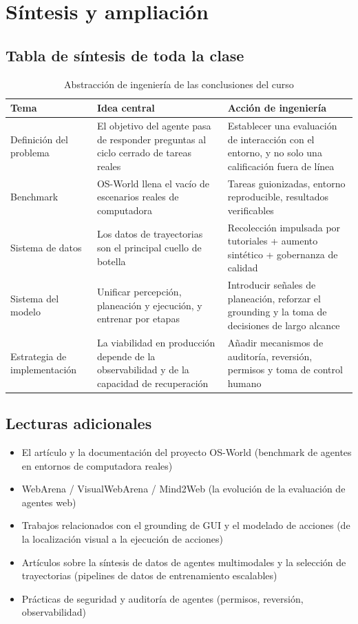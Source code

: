 \documentclass[a4paper]{article}
\begin{document}
\section{Síntesis y ampliación}

\subsection{Tabla de síntesis de toda la clase}
\begin{table}[H]
\centering
\begin{tabular}{p{3.0cm}p{4.6cm}p{4.0cm}}
\toprule
\textbf{Tema} & \textbf{Idea central} & \textbf{Acción de ingeniería} \\
\midrule
Definición del problema & El objetivo del agente pasa de responder preguntas al ciclo cerrado de tareas reales & Establecer una evaluación de interacción con el entorno, y no solo una calificación fuera de línea \\
Benchmark & OS-World llena el vacío de escenarios reales de computadora & Tareas guionizadas, entorno reproducible, resultados verificables \\
Sistema de datos & Los datos de trayectorias son el principal cuello de botella & Recolección impulsada por tutoriales + aumento sintético + gobernanza de calidad \\
Sistema del modelo & Unificar percepción, planeación y ejecución, y entrenar por etapas & Introducir señales de planeación, reforzar el grounding y la toma de decisiones de largo alcance \\
Estrategia de implementación & La viabilidad en producción depende de la observabilidad y de la capacidad de recuperación & Añadir mecanismos de auditoría, reversión, permisos y toma de control humano \\
\bottomrule
\end{tabular}
\caption{Abstracción de ingeniería de las conclusiones del curso}
\end{table}

\subsection{Lecturas adicionales}
\begin{itemize}
    \item El artículo y la documentación del proyecto OS-World (benchmark de agentes en entornos de computadora reales)
    \item WebArena / VisualWebArena / Mind2Web (la evolución de la evaluación de agentes web)
    \item Trabajos relacionados con el grounding de GUI y el modelado de acciones (de la localización visual a la ejecución de acciones)
    \item Artículos sobre la síntesis de datos de agentes multimodales y la selección de trayectorias (pipelines de datos de entrenamiento escalables)
    \item Prácticas de seguridad y auditoría de agentes (permisos, reversión, observabilidad)
\end{itemize}
\end{document}
